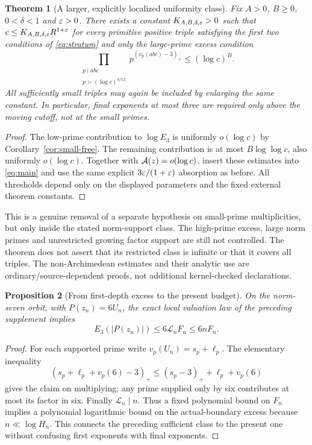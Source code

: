 \documentclass[11pt]{amsart}
\newtheorem{theorem}{Theorem}[section]
\newtheorem{proposition}[theorem]{Proposition}
\theoremstyle{definition}\newtheorem{definition}[theorem]{Definition}
\theoremstyle{remark}\newtheorem{remark}[theorem]{Remark}
\begin{document}
\begin{theorem}[A larger, explicitly localized uniformity class]\label{thm:large-prime-stratum}
Fix $A>0$, $B\ge0$, $0<\delta<1$ and $\varepsilon>0$. There exists a constant $K_{A,B,\delta,\varepsilon}>0$ such that $c\le K_{A,B,\delta,\varepsilon}R^{1+\varepsilon}$ for every primitive positive triple satisfying the first two conditions of \eqref{eq:stratum} and only the large-prime excess condition
\[
 \prod_{\substack{p\mid abc\\p>(\log c)^{\delta/12}}}
        p^{(v_p(abc)-3)_+}\le(\log c)^B.
\]
All sufficiently small triples may again be included by enlarging the same constant. In particular, final exponents at most three are required only above the moving cutoff, not at the small primes.
\end{theorem}
\begin{proof}
The low-prime contribution to $\log E_3$ is uniformly $o(\log c)$ by Corollary~\ref{cor:small-free}. The remaining contribution is at most $B\log\log c$, also uniformly $o(\log c)$. Together with $\mathcal A(z)=o(\log c)$, insert these estimates into \eqref{eq:main} and use the same explicit $3\varepsilon/(1+\varepsilon)$ absorption as before. All thresholds depend only on the displayed parameters and the fixed external theorem constants.
\end{proof}

This is a genuine removal of a separate hypothesis on small-prime multiplicities, but only inside the stated norm-support class. The high-prime excess, large norm primes and unrestricted growing factor support are still not controlled. The theorem does not assert that its restricted class is infinite or that it covers all triples. The non-Archimedean estimates and their analytic use are ordinary/source-dependent proofs, not additional kernel-checked declarations.


\begin{proposition}[From first-depth excess to the present budget]\label{prop:first-to-final}
On the norm-seven orbit, with $P(z_n)=6U_n$, the exact local valuation law of the preceding supplement implies
\[
 E_3(|P(z_n)|)\le6\mathcal L_n F_n\le6nF_n.
\]
\end{proposition}
\begin{proof}
For each supported prime write $v_p(U_n)=s_p+\ell_p$. The elementary inequality
\[
 (s_p+\ell_p+v_p(6)-3)_+\le(s_p-3)_++\ell_p+v_p(6)
\]
gives the claim on multiplying; any prime supplied only by six contributes at most its factor in six. Finally $\mathcal L_n\mid n$. Thus a fixed polynomial bound on $F_n$ implies a polynomial logarithmic bound on the actual-boundary excess because $n\ll\log H_n$. This connects the preceding sufficient class to the present one without confusing first exponents with final exponents.
\end{proof}
\end{document}
